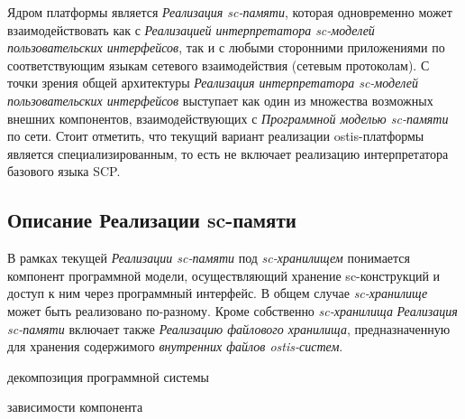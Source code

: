 Ядром платформы является \textit{Реализация sc-памяти}, которая одновременно может взаимодействовать как с \textit{Реализацией интерпретатора sc-моделей пользовательских интерфейсов}, так и с любыми сторонними приложениями по соответствующим языкам сетевого взаимодействия (сетевым протоколам). С точки зрения общей архитектуры \textit{Реализация интерпретатора sc-моделей пользовательских интерфейсов} выступает как один из множества возможных внешних компонентов, взаимодействующих с \textit{Программной моделью sc-памяти} по сети. Стоит отметить, что текущий вариант реализации ostis-платформы является специализированным, то есть не включает реализацию интерпретатора базового языка SCP.

\subsection{Описание Реализации sc-памяти}

В рамках текущей \textit{Реализации sc-памяти} под \textit{sc-хранилищем} понимается компонент программной модели, осуществляющий хранение sc-конструкций и доступ к ним через программный интерфейс. В общем случае \textit{sc-хранилище} может быть реализовано по-разному. Кроме собственно \textit{sc-хранилища} \textit{Реализация sc-памяти} включает также \textit{Реализацию файлового хранилища}, предназначенную для хранения содержимого \textit{внутренних файлов ostis-систем}.

\begin{SCn}
\begin{scnrelfromset}{декомпозиция программной системы}
\end{scnrelfromset}
\begin{scnrelfromset}{зависимости компонента}
\end{scnrelfromset}
\end{SCn}

